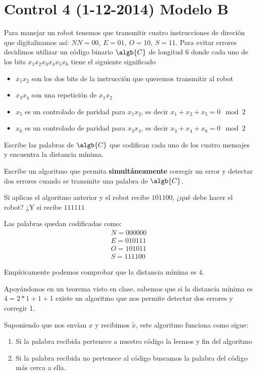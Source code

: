 \section{Control 4 (1-12-2014) Modelo B}
\begin{problem}[1]
Para manejar un robot tenemos que transmitir cuatro instrucciones de direción que digitalizamos así: $NN=00, \ E=01, \ O =10, \ S=11$. Para evitar errores decidimos utilizar un código binario $\algb{C}$ de longitud 6 donde cada uno de los bits $x_1x_2x_3x_4x_5x_6$ tiene el siguiente significado

\begin{itemize}
\item $x_1x_2$ son los dos bits de la instrucción que queremos transmitir al robot
\item $x_3x_4$ son una repetición de $x_1x_2$
\item $x_5$ es un controlado de paridad para $x_1x_2$, es decir $x_1+x_2+x_5 = 0 \mod 2$
\item $x_6$ es un controlado de paridad para $x_3x_4$, es decir $x_3+x_4+x_6 = 0 \mod 2$
\end{itemize}

\ppart Escribe las palabras de $\algb{C}$ que codifican cada uno de los cuatro mensajes y encuentra la distancia mínima.

\ppart Escribe un algoritmo que permita \textbf{simultáneamente} corregir un error y detectar dos errores cuando se transmite una palabra de $\algb{C}$.

\ppart Si aplicas el algoritmo anterior y el robot recibe $101100$, ¿qué debe hacer el robot? ¿Y si recibe $111111$
\solution


\spart
Las palabras quedan codificadas como:
\[\begin{array}{l}
N = 000000\\
E= 010111\\
O= 101011\\
S= 111100
\end{array}\]

Empíricamente podemos comprobar que la distancia mínima es $4$.

\spart
Apoyándonos en un teorema visto en clase, sabemos que si la distancia mínima es $4=2*1+1+1$ existe un algoritmo que nos permite detectar dos errores y corregir 1.

Suponiendo que nos envían $x$ y recibimos $\tilde{x}$, este algoritmo funciona como sigue:
\begin{enumerate}
\item Si la palabra recibida pertenece a nuestro código la leemos y fin del algoritmo
\item Si la palabra recibida no pertenece al código buscamos la palabra del código más cerca a ella.


\end{enumerate}
\end{problem}
